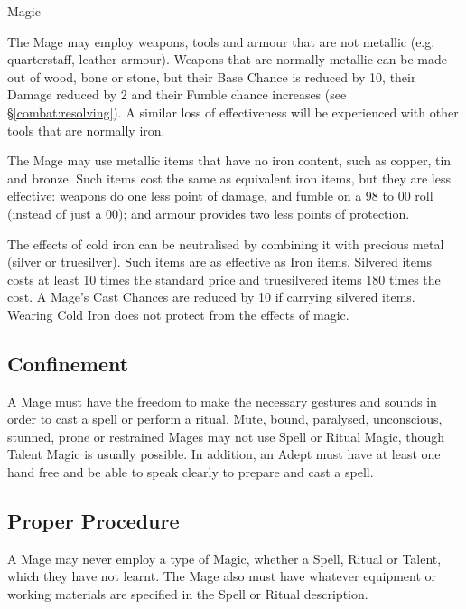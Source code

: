 \begin{Chapter}{Magic}
\begin{Enumerate}
\item The Mage may employ weapons, tools and armour that are not
  metallic (e.g. quarterstaff, leather armour).  Weapons that are
  normally metallic can be made out of wood, bone or stone, but their
  Base Chance is reduced by 10, their Damage reduced by 2 and their
  Fumble chance increases (see \S\ref{combat:resolving}).  A similar
  loss of effectiveness will be experienced with other tools that are
  normally iron.

\item The Mage may use metallic items that have no iron content, such
  as copper, tin and bronze.  Such items cost the same as equivalent
  iron items, but they are less effective: weapons do one less point
  of damage, and fumble on a 98 to 00 roll (instead of just a 00); and
  armour provides two less points of protection.

\item The effects of cold iron can be neutralised by combining it with
  precious metal (silver or truesilver).  Such items are as effective
  as Iron items.  Silvered items costs at least 10 times the standard
  price and truesilvered items 180 times the cost.  A Mage’s Cast
  Chances are reduced by 10 if carrying silvered items. Wearing Cold
  Iron does not protect from the effects of magic.

\end{Enumerate}

\subsection{Confinement}

A Mage must have the freedom to make the necessary gestures and sounds
in order to cast a spell or perform a ritual.  Mute, bound, paralysed,
unconscious, stunned, prone or restrained Mages may not use Spell or
Ritual Magic, though Talent Magic is usually possible.  In addition,
an Adept must have at least one hand free and be able to speak clearly
to prepare and cast a spell.

\subsection{Proper Procedure}

A Mage may never employ a type of Magic, whether a Spell, Ritual or
Talent, which they have not learnt.  The Mage also must have whatever
equipment or working materials are specified in the Spell or Ritual
description.


\end{Chapter}
